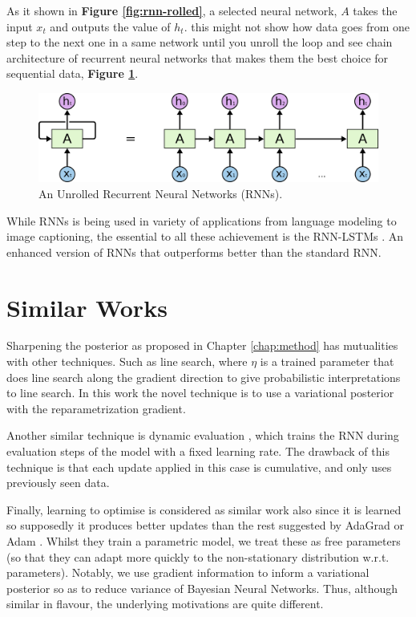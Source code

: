 As it shown in \textbf{Figure \ref{fig:rnn-rolled}}, a selected neural network, $A$ takes the input $x_t$ and outputs the value of $h_t$. this might not show how data goes from one step to the next one in a same network until you unroll the loop and see chain architecture of recurrent neural networks that makes them the best choice for sequential data, \textbf{Figure \ref{fig:rnn-unrolled}}.

\begin{figure}[p]
	\centering
	\includegraphics[scale=0.4]{./figs/rnn-unrolled}
	\caption[An Unrolled Recurrent Neural Networks]{An Unrolled Recurrent Neural Networks (RNNs).}
	\label{fig:rnn-unrolled}
\end{figure}

While RNNs is being used in variety of applications from language modeling to image captioning, the essential to all these achievement is the RNN-LSTMs \cite{Hochreiter1997}. An enhanced version of RNNs that outperforms better than the standard RNN.

\section{Similar Works}
Sharpening the posterior as proposed in Chapter \ref{chap:method} has mutualities with other techniques. Such as line search, where $\eta$ is a trained parameter that does line search along the gradient direction to give probabilistic interpretations to line search. In this work the novel technique is to use a variational posterior with the reparametrization gradient.

Another similar technique is dynamic evaluation \cite{Mikolov2010}, which trains the RNN during evaluation steps of the model with a fixed learning rate. The drawback of this technique is that each update applied in this case is cumulative, and only uses previously seen data.

Finally, learning to optimise \cite{Li2016a} is considered as similar work also since it is learned so supposedly it produces better updates than the rest suggested by AdaGrad \cite{Duchi2011} or Adam \cite{Kingma2013a}. Whilst they train a parametric model, we treat these as free parameters (so that they can adapt more quickly to the non-stationary distribution w.r.t. parameters). Notably, we use gradient information to inform a variational posterior so as to reduce variance of Bayesian Neural Networks. Thus, although similar in flavour, the underlying motivations are quite different.

